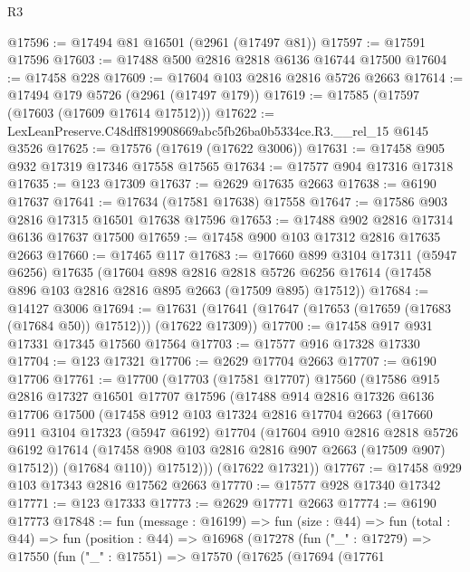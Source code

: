 \begin{lexlean}{R3}
\begin{coremodule}
@17596 := @17494 @81 @16501 (@2961 (@17497 @81))
@17597 := @17591 @17596
@17603 := @17488 @500 @2816 @2818 @6136 @16744 @17500
@17604 := @17458 @228
@17609 := @17604 @103 @2816 @2816 @5726 @2663
@17614 := @17494 @179 @5726 (@2961 (@17497 @179))
@17619 := @17585 (@17597 (@17603 (@17609 @17614 @17512)))
@17622 := LexLeanPreserve.C48dff819908669abc5fb26ba0b5334ce.R3.__rel_15 @6145 @3526
@17625 := @17576 (@17619 (@17622 @3006))
@17631 := @17458 @905 @932 @17319 @17346 @17558 @17565
@17634 := @17577 @904 @17316 @17318
@17635 := @123 @17309
@17637 := @2629 @17635 @2663
@17638 := @6190 @17637
@17641 := @17634 (@17581 @17638) @17558
@17647 := @17586 @903 @2816 @17315 @16501 @17638 @17596
@17653 := @17488 @902 @2816 @17314 @6136 @17637 @17500
@17659 := @17458 @900 @103 @17312 @2816 @17635 @2663
@17660 := @17465 @117
@17683 := @17660
    @899
    @3104
    @17311
    (@5947 @6256)
    @17635
    (@17604
      @898
      @2816
      @2818
      @5726
      @6256
      @17614
      (@17458 @896 @103 @2816 @2816 @895 @2663 (@17509 @895) @17512))
@17684 := @14127 @3006
@17694 := @17631 (@17641 (@17647 (@17653 (@17659 (@17683 (@17684 @50)) @17512))) (@17622 @17309))
@17700 := @17458 @917 @931 @17331 @17345 @17560 @17564
@17703 := @17577 @916 @17328 @17330
@17704 := @123 @17321
@17706 := @2629 @17704 @2663
@17707 := @6190 @17706
@17761 := @17700
    (@17703
      (@17581 @17707)
      @17560
      (@17586
        @915
        @2816
        @17327
        @16501
        @17707
        @17596
        (@17488
          @914
          @2816
          @17326
          @6136
          @17706
          @17500
          (@17458
            @912
            @103
            @17324
            @2816
            @17704
            @2663
            (@17660
              @911
              @3104
              @17323
              (@5947 @6192)
              @17704
              (@17604
                @910
                @2816
                @2818
                @5726
                @6192
                @17614
                (@17458 @908 @103 @2816 @2816 @907 @2663 (@17509 @907) @17512))
              (@17684 @110))
            @17512)))
      (@17622 @17321))
@17767 := @17458 @929 @103 @17343 @2816 @17562 @2663
@17770 := @17577 @928 @17340 @17342
@17771 := @123 @17333
@17773 := @2629 @17771 @2663
@17774 := @6190 @17773
@17848 := fun (message : @16199) =>
  fun (size : @44) =>
  fun (total : @44) =>
  fun (position : @44) =>
  @16968
    (@17278
      (fun ("_" : @17279) =>
      @17550
        (fun ("_" : @17551) =>
        @17570
          (@17625
            (@17694
              (@17761

\end{coremodule}
\end{lexlean}
